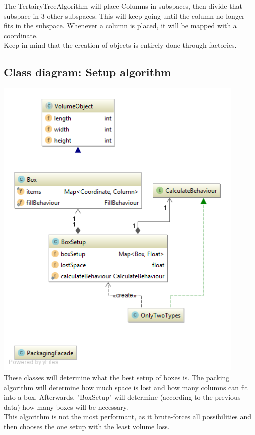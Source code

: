 \documentclass[a4paper,12pt]{article}
\begin{document}
The TertairyTreeAlgorithm will place Columns in subspaces, then divide that subspace in 3 other subspaces. This will keep going until the column no longer fits in the subspace. Whenever a column is placed, it will be mapped with a coordinate. \\

Keep in mind that the creation of objects is entirely done through factories.

\pagebreak


\subsection{Class diagram: Setup algorithm}
\includegraphics[width=12cm]{Class_diagram_setup_classes2.png}\\
These classes will determine what the best setup of boxes is. The packing algorithm will determine how much space is lost and how many columns can fit into a box. Afterwards, "BoxSetup" will determine (according to the previous data) how many boxes will be necessary.\\

This algorithm is not the most performant, as it brute-forces all possibilities and then chooses the one setup with the least volume loss.\\
\end{document}
